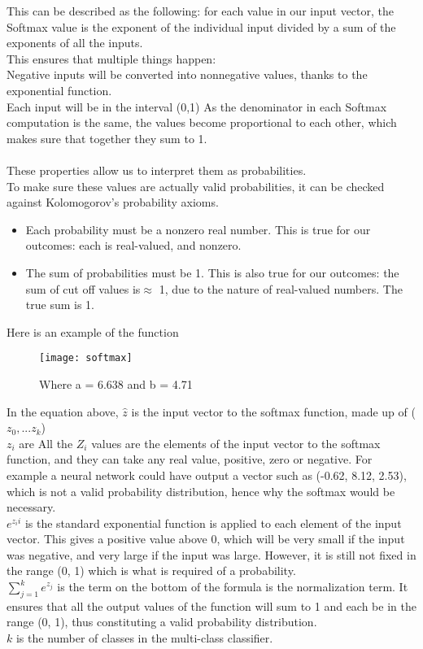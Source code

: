 \documentclass{article}
\begin{document}
\begin{itemize}
\begin{itemize}
This can be described as the following: for each value in our input vector, the Softmax value is the exponent of the individual input divided by a sum of the exponents of all the inputs.
\\
This ensures that multiple things happen:
\\
Negative inputs will be converted into nonnegative values, thanks to the exponential function.\\
Each input will be in the interval (0,1)
As the denominator in each Softmax computation is the same, the values become proportional to each other, which makes sure that together they sum to 1.\\
\\
These properties allow us to interpret them as probabilities.
\\
To make sure these values are actually valid probabilities, it can be checked against Kolomogorov’s probability axioms.
\begin{itemize}
    \item Each probability must be a nonzero real number. This is true for our outcomes: each is real-valued, and nonzero.
    \item The sum of probabilities must be 1. This is also true for our outcomes: the sum of cut off values is$\approx$ 1, due to the nature of real-valued numbers. The true sum is 1.
\end{itemize}
Here is an example of the function
\begin{figure}[H]
            \centering
            \texttt{[image: softmax]}
            \caption{Where a = 6.638 and b = 4.71}
        \end{figure}
        \end{itemize}
        In the equation above, $\hat{z}$ is the input vector to the softmax function, made up of ($z_0, ... z_k$)\\
        $z_i$ are All the $Z_i$ values are the elements of the input vector to the softmax function, and they can take any real value, positive, zero or negative. For example a neural network could have output a vector such as (-0.62, 8.12, 2.53), which is not a valid probability distribution, hence why the softmax would be necessary.\\
        $e^{z_ii}$ is the  standard exponential function is applied to each element of the input vector. This gives a positive value above 0, which will be very small if the input was negative, and very large if the input was large. However, it is still not fixed in the range (0, 1) which is what is required of a probability.\\
$\sum_{j=1}^{k}{e^{z_j}}$ is the term on the bottom of the formula is the normalization term. It ensures that all the output values of the function will sum to 1 and each be in the range (0, 1), thus constituting a valid probability distribution.\\
        $k$ is the number of classes in the multi-class classifier.
\end{itemize}
\end{document}
